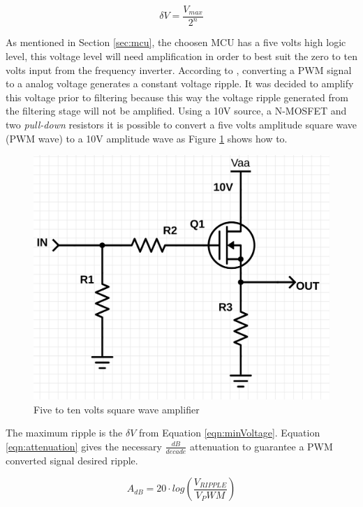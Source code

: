 			\begin{equation}\label{eqn:minVoltage}
				\delta V=\frac{V_{max}}{2^{n}}
			\end{equation}
	
		As mentioned in Section \ref{sec:mcu}, the choosen MCU has a five volts high logic level, this voltage level will need amplification in order to best suit the zero to ten volts input from the frequency inverter. According to \cite{alter2008pwm}, converting a PWM signal to a analog voltage generates a constant voltage ripple. It was decided to amplify this voltage prior to filtering because this way the voltage ripple generated from the filtering stage will not be amplified. Using a 10V source, a N-MOSFET and two \textit{pull-down} resistors it is possible to convert a five volts amplitude square wave (PWM wave) to a 10V amplitude wave as Figure \ref{fig:fiveToTenVolts} shows how to.

		\begin{figure}[htbp]
			\centering
				\includegraphics[scale=0.4]{figuras/fig-fiveToTenVolts}
			\caption{Five to ten volts square wave amplifier}
			\label{fig:fiveToTenVolts}
		\end{figure}
		
		The maximum ripple is the $\delta V$ from Equation \ref{eqn:minVoltage}. Equation \ref{eqn:attenuation} \cite{metivier2013pwm} gives the necessary $\frac{dB}{decade}$ attenuation to guarantee a PWM converted signal desired ripple.

	 		\begin{equation}\label{eqn:attenuation}
				A_{dB}=20\cdot log \left( \frac{V_{RIPPLE}}{V_PWM} \right) 
			\end{equation}
			
